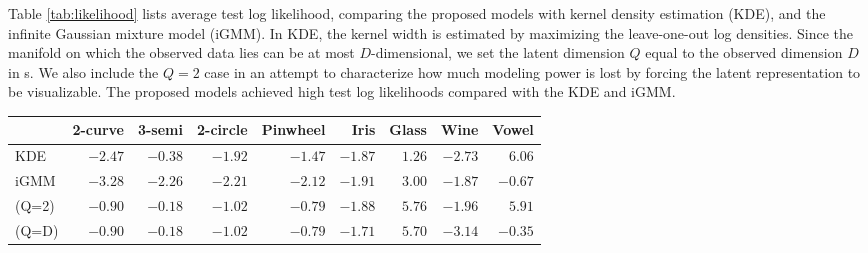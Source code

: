 Table \ref{tab:likelihood} lists average test log likelihood, comparing the proposed models
with kernel density estimation (KDE),
and the infinite Gaussian mixture model (iGMM).
In KDE, the kernel width is estimated by maximizing the leave-one-out log densities.
Since the manifold on which the observed data lies can be at most $D$-dimensional, we set the latent dimension $Q$ equal to the observed dimension $D$ in \iwmm{}s.
We also include the $Q=2$ case in an attempt to characterize how much modeling power is lost by forcing the latent representation to be visualizable. 
The proposed models achieved high test log likelihoods compared with the KDE and iGMM.

\begin{table*}[ht!]
\centering
\caption[Predictive log-likelihood comparison]
{Average test log-likelihood for evaluating density estimation performance.}
\label{tab:likelihood}
\begin{tabular}{lrrrrrrrr}
\hline
& 2-curve & 3-semi & 2-circle & Pinwheel & Iris  & Glass  & Wine  & Vowel  \\
\hline 
KDE & $-2.47$ & $-0.38$ & $-1.92$ & $-1.47$ & $\mathbf{-1.87}$ & $1.26$ & $-2.73$ & $\mathbf{6.06}$ \\
iGMM & $-3.28$ & $-2.26$ & $-2.21$ & $-2.12$ & $-1.91$ & $3.00$ & $\mathbf{-1.87}$ & $-0.67$ \\
\iwmm{}(Q=2) & $\mathbf{-0.90}$ & $\mathbf{-0.18}$ & $\mathbf{-1.02}$ & $\mathbf{-0.79}$ & $\mathbf{-1.88}$ & $\mathbf{5.76}$ & $\mathbf{-1.96}$ & $\mathbf{5.91}$ \\
\iwmm{}(Q=D) & $\mathbf{-0.90}$ & $\mathbf{-0.18}$ & $\mathbf{-1.02}$ & $\mathbf{-0.79}$ & $\mathbf{-1.71}$ & $\mathbf{5.70}$ & $-3.14$ & $-0.35$ \\
\hline
\end{tabular}
\end{table*}

